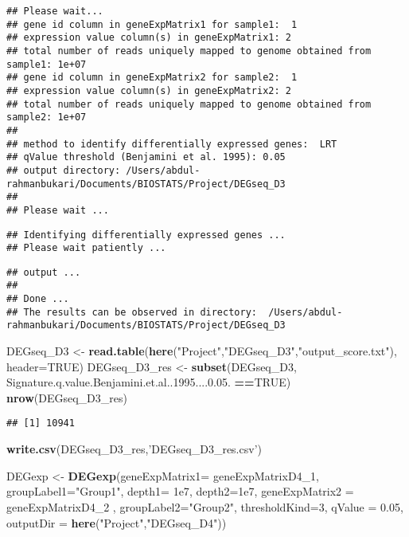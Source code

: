 \documentclass[]{article}
\newenvironment{Shaded}{\begin{snugshade}}{\end{snugshade}}
\newcommand{\DataTypeTok}[1]{\textcolor[rgb]{0.13,0.29,0.53}{#1}}
\newcommand{\DecValTok}[1]{\textcolor[rgb]{0.00,0.00,0.81}{#1}}
\newcommand{\FloatTok}[1]{\textcolor[rgb]{0.00,0.00,0.81}{#1}}
\newcommand{\KeywordTok}[1]{\textcolor[rgb]{0.13,0.29,0.53}{\textbf{#1}}}
\newcommand{\NormalTok}[1]{#1}
\newcommand{\OperatorTok}[1]{\textcolor[rgb]{0.81,0.36,0.00}{\textbf{#1}}}
\newcommand{\OtherTok}[1]{\textcolor[rgb]{0.56,0.35,0.01}{#1}}
\newcommand{\StringTok}[1]{\textcolor[rgb]{0.31,0.60,0.02}{#1}}
\begin{document}
\begin{verbatim}
## Please wait...
## gene id column in geneExpMatrix1 for sample1:  1 
## expression value column(s) in geneExpMatrix1: 2 
## total number of reads uniquely mapped to genome obtained from sample1: 1e+07 
## gene id column in geneExpMatrix2 for sample2:  1 
## expression value column(s) in geneExpMatrix2: 2 
## total number of reads uniquely mapped to genome obtained from sample2: 1e+07 
## 
## method to identify differentially expressed genes:  LRT 
## qValue threshold (Benjamini et al. 1995): 0.05 
## output directory: /Users/abdul-rahmanbukari/Documents/BIOSTATS/Project/DEGseq_D3 
## 
## Please wait ...
\end{verbatim}

\begin{verbatim}
## Identifying differentially expressed genes ...
## Please wait patiently ...
\end{verbatim}

\begin{verbatim}
## output ...
## 
## Done ...
## The results can be observed in directory:  /Users/abdul-rahmanbukari/Documents/BIOSTATS/Project/DEGseq_D3
\end{verbatim}

\begin{Shaded}
\begin{Highlighting}[]
\NormalTok{DEGseq_D3 <-}\StringTok{ }\KeywordTok{read.table}\NormalTok{(}\KeywordTok{here}\NormalTok{(}\StringTok{"Project"}\NormalTok{,}\StringTok{"DEGseq_D3"}\NormalTok{,}\StringTok{"output_score.txt"}\NormalTok{), }\DataTypeTok{header=}\OtherTok{TRUE}\NormalTok{)}
\NormalTok{DEGseq_D3_res <-}\StringTok{ }\KeywordTok{subset}\NormalTok{(DEGseq_D3, Signature.q.value.Benjamini.et.al..}\DecValTok{1995}\NormalTok{....}\DecValTok{0}\NormalTok{.}\FloatTok{05.} \OperatorTok{==}\OtherTok{TRUE}\NormalTok{)}
\KeywordTok{nrow}\NormalTok{(DEGseq_D3_res)}
\end{Highlighting}
\end{Shaded}

\begin{verbatim}
## [1] 10941
\end{verbatim}

\begin{Shaded}
\begin{Highlighting}[]
\KeywordTok{write.csv}\NormalTok{(DEGseq_D3_res,}\StringTok{'DEGseq_D3_res.csv'}\NormalTok{)}

\NormalTok{DEGexp <-}\StringTok{ }\KeywordTok{DEGexp}\NormalTok{(}\DataTypeTok{geneExpMatrix1=}\NormalTok{ geneExpMatrixD4_}\DecValTok{1}\NormalTok{, }\DataTypeTok{groupLabel1=}\StringTok{"Group1"}\NormalTok{, }\DataTypeTok{depth1=} \FloatTok{1e7}\NormalTok{, }\DataTypeTok{depth2=}\FloatTok{1e7}\NormalTok{, }\DataTypeTok{geneExpMatrix2 =}\NormalTok{ geneExpMatrixD4_}\DecValTok{2}\NormalTok{ , }\DataTypeTok{groupLabel2=}\StringTok{"Group2"}\NormalTok{, }\DataTypeTok{thresholdKind=}\DecValTok{3}\NormalTok{, }\DataTypeTok{qValue =} \FloatTok{0.05}\NormalTok{, }\DataTypeTok{outputDir =} \KeywordTok{here}\NormalTok{(}\StringTok{"Project"}\NormalTok{,}\StringTok{"DEGseq_D4"}\NormalTok{))}
\end{Highlighting}
\end{Shaded}
\end{document}

